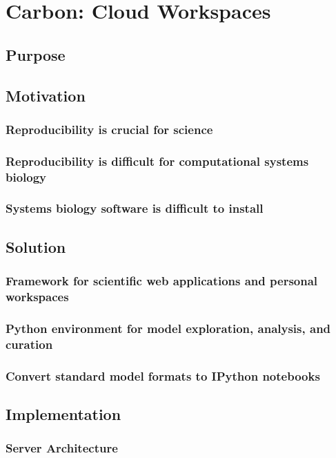 \chapter{Carbon: Cloud Workspaces}

\section{Purpose}


\section{Motivation}
\subsection{Reproducibility is crucial for science}
\subsection{Reproducibility is difficult for computational systems biology}
\subsection{Systems biology software is difficult to install}


\section{Solution}
\subsection{Framework for scientific web applications and personal workspaces}
\subsection{Python environment for model exploration, analysis, and curation}
\subsection{Convert standard model formats to IPython notebooks}


\section{Implementation}
\subsection{Server Architecture}
